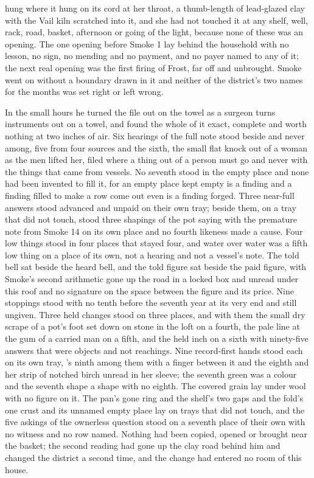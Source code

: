  hung where it hung on its cord at her throat, a thumb-length of lead-glazed clay with the Vail kiln scratched into it, and she had not touched it at any shelf, well, rack, road, basket, afternoon or going of the light, because none of these was an opening. The one opening before Smoke 1 lay behind the household with no lesson, no sign, no mending and no payment, and no payer named to any of it; the next real opening was the first firing of Frost, far off and unbrought. Smoke went on without a boundary drawn in it and neither of the district's two names for the months was set right or left wrong.

\scenebreak

In the small hours he turned the file out on the towel as a surgeon turns instruments out on a towel, and found the whole of it exact, complete and worth nothing at two inches of air. Six hearings of the full note stood beside and never among, five from four sources and the sixth, the small flat knock out of a woman as the men lifted her, filed where a thing out of a person must go and never with the things that came from vessels. No seventh stood in the empty place and none had been invented to fill it, for an empty place kept empty is a finding and a finding filled to make a row come out even is a finding forged. Three near-full answers stood advanced and unpaid on their own tray; beside them, on a tray that did not touch, stood three shapings of the pot saying with the premature note from Smoke 14 on its own place and no fourth likeness made a cause. Four low things stood in four places that stayed four, and water over water was a fifth low thing on a place of its own, not a hearing and not a vessel's note. The told bell sat beside the heard bell, and the told figure sat beside the paid figure, with Smoke's second arithmetic gone up the road in a locked box and unread under this roof and no signature on the space between the figure and its price. Nine stoppings stood with no tenth before the seventh year at its very end and still ungiven. Three held changes stood on three places, and with them the small dry scrape of a pot's foot set down on stone in the loft on a fourth, the pale line at the gum of a carried man on a fifth, and the held inch on a sixth with ninety-five answers that were objects and not reachings. Nine record-first hands stood each on its own tray, 's ninth among them with a finger between it and the eighth and her strip of notched birch unread in her sleeve; the seventh green was a colour and the seventh shape a shape with no eighth. The covered grain lay under wool with no figure on it. The pan's gone ring and the shelf's two gaps and the fold's one crust and its unnamed empty place lay on trays that did not touch, and the five askings of the ownerless question stood on a seventh place of their own with no witness and no row named. Nothing had been copied, opened or brought near the basket; the second reading had gone up the clay road behind him and changed the district a second time, and the change had entered no room of this house.

